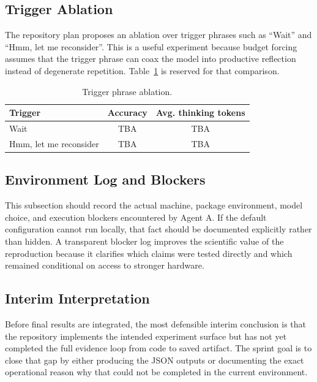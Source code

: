 \subsection{Trigger Ablation}

The repository plan proposes an ablation over trigger phrases such as ``Wait'' and ``Hmm, let me reconsider''. This is a useful experiment because budget forcing assumes that the trigger phrase can coax the model into productive reflection instead of degenerate repetition. Table~\ref{tab:trigger} is reserved for that comparison.

\begin{table}[H]
\centering
\caption{Trigger phrase ablation.}
\label{tab:trigger}
\begin{tabular}{lcc}
\toprule
Trigger & Accuracy & Avg. thinking tokens \\
\midrule
Wait & TBA & TBA \\
Hmm, let me reconsider & TBA & TBA \\
\bottomrule
\end{tabular}
\end{table}

\subsection{Environment Log and Blockers}

This subsection should record the actual machine, package environment, model choice, and execution blockers encountered by Agent A. If the default configuration cannot run locally, that fact should be documented explicitly rather than hidden. A transparent blocker log improves the scientific value of the reproduction because it clarifies which claims were tested directly and which remained conditional on access to stronger hardware.

\subsection{Interim Interpretation}

Before final results are integrated, the most defensible interim conclusion is that the repository implements the intended experiment surface but has not yet completed the full evidence loop from code to saved artifact. The sprint goal is to close that gap by either producing the JSON outputs or documenting the exact operational reason why that could not be completed in the current environment.